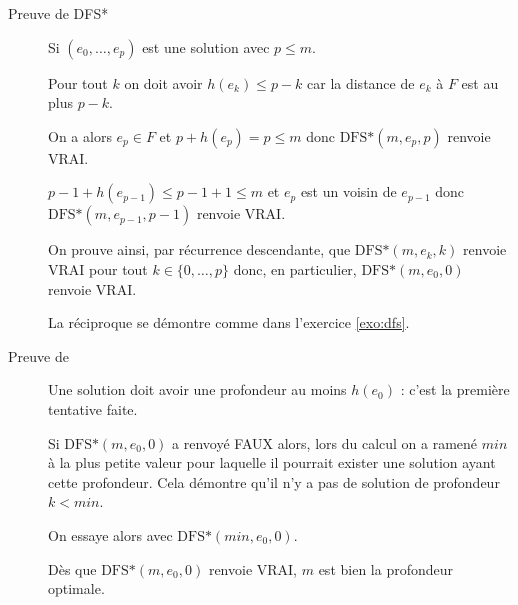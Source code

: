 \begin{Exercise} 
\begin{description}
\item[Preuve de DFS*] 
Si $(e_0,\dots,e_p)$ est une solution avec $p \le m$.

Pour tout $k$ on doit avoir $h(e_k) \le p-k$ car la distance de $e_k$ à $F$ est au plus $p-k$.

On a alors $e_p\in F$ et $p + h(e_p) = p \le m$ donc $\text{DFS*}(m,e_p,p)$ renvoie VRAI.

$p-1 + h(e_{p-1}) \le p-1+1 \le m$ et $e_p$ est un voisin de $e_{p-1}$ donc $\text{DFS*}(m,e_{p-1},p-1)$ renvoie VRAI.

On prouve ainsi, par récurrence descendante, que $\text{DFS*}(m,e_k,k)$ renvoie VRAI pour tout $k\in \{0, \ldots, p\}$ donc, en particulier, $\text{DFS*}(m,e_0,0)$ renvoie VRAI.

\smallskip  

La réciproque se démontre comme dans l'exercice \ref{exo:dfs}.

\item[Preuve de ]

Une solution doit avoir une profondeur au moins $h(e_0)$ : c'est la première tentative faite.

Si $\text{DFS*}(m,e_0,0)$ a renvoyé FAUX alors, lors du calcul on a ramené $min$ à la plus petite valeur pour laquelle il pourrait exister une solution ayant cette profondeur. Cela démontre qu'il n'y a pas de solution de profondeur $k < min$.

On essaye alors avec $\text{DFS*}(min,e_0,0)$.

Dès que $\text{DFS*}(m,e_0,0)$ renvoie VRAI, $m$ est bien la profondeur optimale.
\end{description}
\end{Exercise}
